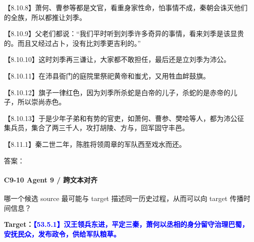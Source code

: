 \documentclass[fontset=none,11pt,a4paper]{ctexart}
\newcommand{\answerline}[1]{\underline{\hspace{#1}}}
\begin{document}
\begin{enumerate}[label=\Alph*.]
\noindent 【8.10.8】萧何、曹参等都是文官，看重身家性命，怕事情不成，秦朝会诛灭他们的全族，所以都推让刘季。\par
\noindent 【8.10.9】父老们都说：“我们平时听到刘季许多奇异的事情，看来刘季是该显贵的。而且又经过占卜，没有比刘季更吉利的。”\par
\noindent 【8.10.10】这时刘季再三谦让，大家都不敢担任，最后还是立刘季为沛公。\par
\noindent 【8.10.11】在沛县衙门的庭院里祭祀黄帝和蚩尤，又用牲血衅鼓旗。\par
\noindent 【8.10.12】旗子一律红色，因为刘季所杀蛇是白帝的儿子，杀蛇的是赤帝的儿子，所以崇尚赤色。\par
\noindent 【8.10.13】于是少年子弟和有势的官吏，如萧何、曹参、樊哙等人，都为沛公征集兵员，集合了两三千人，攻打胡陵、方与，回军固守丰邑。\par
\noindent 【8.11.1】秦二世二年，陈胜将领周章的军队西至戏水而还。\par
\end{enumerate}
答案：\answerline{2.2cm}

\paragraph{C9-10 \quad Agent 9 / 跨文本对齐}
哪一个候选 source 最可能与 target 描述同一历史过程，从而可以向 target 传播时间信息？

\textbf{Target：}\textcolor{blue}{\textbf{【53.5.1】汉王领兵东进，平定三秦，萧何以丞相的身分留守治理巴蜀，安抚民众，发布政令，供给军队粮草。}}
\end{document}
